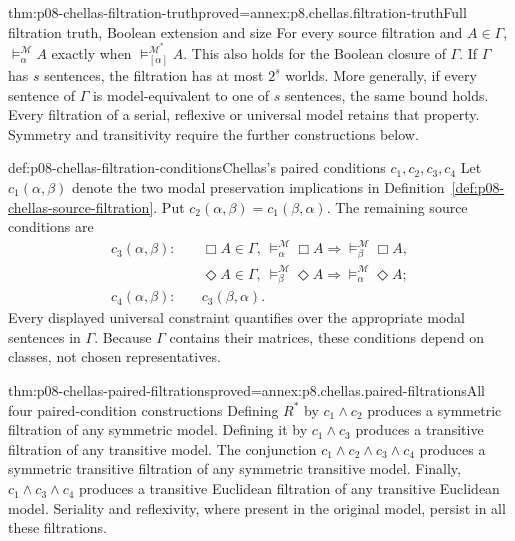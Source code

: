 \begin{hbtheorem}{thm:p08-chellas-filtration-truth}{proved=annex:p8.chellas.filtration-truth}{Full filtration truth, Boolean extension and size}
For every source filtration and \(A\in\Gamma\),
\(\models_\alpha^{\mathcal M}A\) exactly when
\(\models_{[\alpha]}^{\mathcal M^*}A\).
This also holds for the Boolean closure of \(\Gamma\).
If \(\Gamma\) has \(s\) sentences, the filtration has at most
\(2^s\) worlds. More generally, if every sentence of \(\Gamma\)
is model-equivalent to one of \(s\) sentences, the same bound holds.
Every filtration of a serial, reflexive or universal model retains that
property. Symmetry and transitivity require the further constructions below.
\end{hbtheorem}

\begin{hbdefinition}{def:p08-chellas-filtration-conditions}{Chellas's paired conditions \(c_1,c_2,c_3,c_4\)}
Let \(c_1(\alpha,\beta)\) denote the two modal preservation
implications in Definition~\ref{def:p08-chellas-source-filtration}.
Put \(c_2(\alpha,\beta)=c_1(\beta,\alpha)\).
The remaining source conditions are
\[
\begin{aligned}
 c_3(\alpha,\beta):\quad &
  \Box A\in\Gamma,\ \models_\alpha^{\mathcal M}\Box A
       \Rightarrow\models_\beta^{\mathcal M}\Box A,\\[-2pt]
 &\Diamond A\in\Gamma,\ \models_\beta^{\mathcal M}\Diamond A
       \Rightarrow\models_\alpha^{\mathcal M}\Diamond A;\\
 c_4(\alpha,\beta):\quad &c_3(\beta,\alpha).
\end{aligned}
\]
Every displayed universal constraint quantifies over the appropriate
modal sentences in \(\Gamma\). Because \(\Gamma\) contains their
matrices, these conditions depend on classes, not chosen representatives.
\end{hbdefinition}

\begin{hbtheorem}{thm:p08-chellas-paired-filtrations}{proved=annex:p8.chellas.paired-filtrations}{All four paired-condition constructions}
Defining \(R^*\) by \(c_1\land c_2\) produces a symmetric
filtration of any symmetric model. Defining it by \(c_1\land c_3\)
produces a transitive filtration of any transitive model.
The conjunction \(c_1\land c_2\land c_3\land c_4\) produces a symmetric
transitive filtration of any symmetric transitive model.
Finally, \(c_1\land c_3\land c_4\) produces a transitive Euclidean
filtration of any transitive Euclidean model. Seriality and reflexivity,
where present in the original model, persist in all these filtrations.
\end{hbtheorem}

